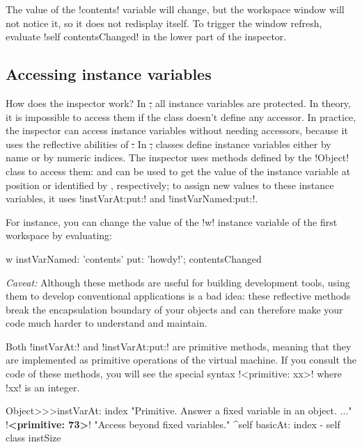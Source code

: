 \documentclass[a4paper,10pt,twoside]{book}
\begin{document}
The value of the \ct!contents! variable will change, but the workspace window will not notice it, so it does not redisplay itself.
To trigger the window refresh, evaluate \ct!self contentsChanged! in the lower part of the inspector.

\subsection{Accessing instance variables}

How does the inspector work?
In \st, all instance variables are protected.
In theory, it is impossible to access them if the class doesn't define any accessor.
In practice, the inspector can access instance variables without needing accessors, because it uses the reflective abilities of \st.
In \st, classes define instance variables either by name or by numeric indices.
The inspector uses methods defined by the \ct!Object! class to access them:  and  can be used to get the value of the instance variable at position  or identified by , respectively; to assign new values to these instance variables, it uses \ct!instVarAt:put:! and \ct!instVarNamed:put:!.

For instance, you can change the value of the \ct!w! instance variable of the first workspace by evaluating:
\begin{code}{}
w instVarNamed: 'contents' put: 'howdy!'; contentsChanged
\end{code}

\emph{Caveat:} Although these methods are useful for building development tools, using them to develop conventional applications is a bad idea: these reflective methods break the encapsulation boundary of your objects and can therefore make your code much harder to understand and maintain.

Both \ct!instVarAt:! and \ct!instVarAt:put:! are primitive methods, meaning that they are implemented as primitive operations of the \pharo virtual machine.
If you consult the code of these methods, you will see the special syntax \ct!<primitive: xx>! where \ct!xx! is an integer.

\begin{code}{}
Object>>>instVarAt: index 
	"Primitive. Answer a fixed variable in an object. ..."
	!\textbf{<primitive: 73>}!
	"Access beyond fixed variables."
	^self basicAt: index - self class instSize		
\end{code}
\end{document}
